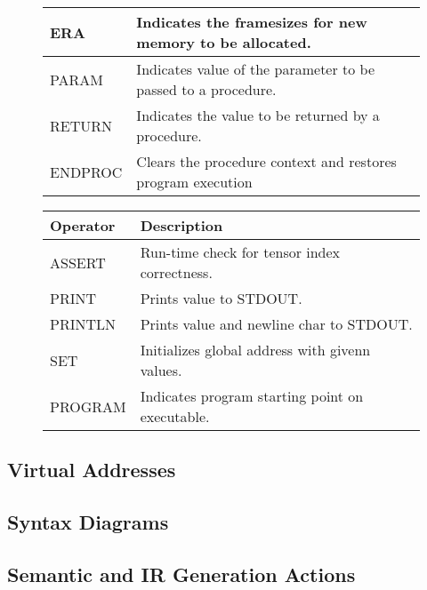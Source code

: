\begin{figure}[h]
\begin{tabular}{p{1in}p{3in}}
        \midrule ERA &
        Indicates the framesizes for new memory to be \newline allocated.\\

        \midrule PARAM &
        Indicates value of the parameter to be passed to a procedure.\\

        \midrule RETURN &
        Indicates the value to be returned by a procedure.\\

        \midrule ENDPROC &
        Clears the procedure context and restores program execution\\

        \bottomrule
    \end{tabular}
\end{figure}

\begin{figure}[h]
    \centering
    \begin{tabular}{p{1in}p{3in}}
        \toprule
        \textbf{Operator} & \textbf{Description}\\
        \midrule ASSERT &
        Run-time check for tensor index correctness.\\

        \midrule PRINT &
        Prints value to STDOUT.\\

        \midrule PRINTLN &
        Prints value and newline char to STDOUT.\\

        \midrule SET &
        Initializes global address with givenn values.\\

        \midrule PROGRAM &
        Indicates program starting point on executable.\\

        \bottomrule
    \end{tabular}
\end{figure}
\subsection{Virtual Addresses}
\subsection{Syntax Diagrams}
\subsection{Semantic and IR Generation Actions}
